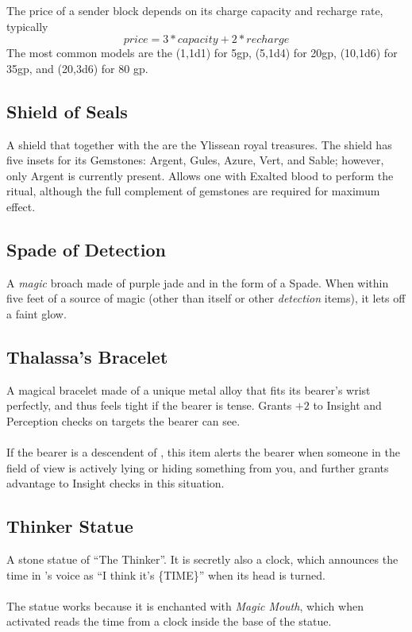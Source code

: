 The price of a sender block depends on its charge capacity and recharge rate, typically
\[ price = 3 * capacity + 2*recharge \]
The most common models are the (1,1d1) for 5gp, (5,1d4) for 20gp, (10,1d6) for 35gp, and (20,3d6) for 80 gp. 


\subsection{Shield of Seals}
\label{items:fireemblem}
A shield that together with the  are the Ylissean royal treasures. The shield has five insets for its Gemstones: Argent, Gules, Azure, Vert, and Sable; however, only Argent is currently present. Allows one with Exalted blood to perform the  ritual, although the full complement of gemstones are required for maximum effect.

\subsection{Spade of Detection}
\label{items:detectspade}
A \textit{magic} broach made of purple jade and in the form of a Spade. When within five feet of a source of magic (other than itself or other \textit{detection} items), it lets off a faint glow.

\subsection{Thalassa's Bracelet}
\label{items:bracelet}
A magical bracelet made of a unique metal alloy that fits its bearer's wrist perfectly, and thus feels tight if the bearer is tense. Grants $+2$ to Insight and Perception checks on targets the bearer can see.\\
\\
If the bearer is a descendent of , this item alerts the bearer when someone in the field of view is actively lying or hiding something from you, and further grants advantage to Insight checks in this situation.

\subsection{Thinker Statue}
\label{items:thinker}
A stone statue of ``The Thinker''. It is secretly also a clock, which announces the time in 's voice as ``I think it's \{TIME\}'' when its head is turned. \\
\\
The statue works because it is enchanted with \textit{Magic Mouth}, which when activated reads the time from a clock inside the base of the statue.



